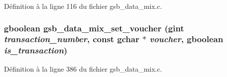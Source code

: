 Définition à la ligne 116 du fichier gsb\_\-data\_\-mix.c.

\subsubsection[{gsb\_\-data\_\-mix\_\-set\_\-voucher}]{\setlength{\rightskip}{0pt plus 5cm}gboolean gsb\_\-data\_\-mix\_\-set\_\-voucher (gint {\em transaction\_\-number}, \/  const gchar $\ast$ {\em voucher}, \/  gboolean {\em is\_\-transaction})}\label{gsb__data__mix_8h_a5277046f76b6bc872ef6c9df7b9fb6ca}


Définition à la ligne 386 du fichier gsb\_\-data\_\-mix.c.

